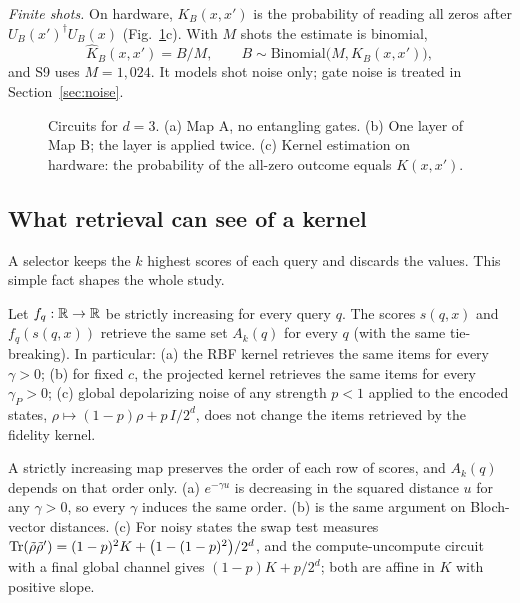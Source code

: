\emph{Finite shots.} On hardware, $K_B(x,x')$ is the probability of reading all zeros after
$U_B(x')^\dagger U_B(x)$ (Fig.~\ref{fig:circuits}c). With $M$ shots the estimate is binomial,
\begin{equation}
\hat K_B(x,x') = B/M,\qquad B\sim\mathrm{Binomial}\bigl(M,K_B(x,x')\bigr),
\label{eq:shots}
\end{equation}
and S9 uses $M=1{,}024$. It models shot noise only; gate noise is treated in Section~\ref{sec:noise}.

\begin{figure}[t]
\centering

\caption{Circuits for $d=3$. (a) Map A, no entangling gates. (b) One layer of Map B; the layer is
applied twice. (c) Kernel estimation on hardware: the probability of the all-zero outcome equals
$K(x,x')$.}
\label{fig:circuits}
\end{figure}

\subsection{What retrieval can see of a kernel}
\label{sec:rank}
A selector keeps the $k$ highest scores of each query and discards the values. This simple fact shapes
the whole study.

\begin{proposition}
\label{prop:rank}
Let $f_q:\mathbb{R}\to\mathbb{R}$ be strictly increasing for every query $q$. The scores $s(q,x)$ and $f_q(s(q,x))$
retrieve the same set $A_k(q)$ for every $q$ (with the same tie-breaking). In particular: (a) the RBF
kernel retrieves the same items for every $\gamma>0$; (b) for fixed $c$, the projected kernel retrieves
the same items for every $\gamma_P>0$; (c) global depolarizing noise of any strength $p<1$ applied to the
encoded states, $\rho\mapsto(1-p)\rho+p\,I/2^d$, does not change the items retrieved by the fidelity
kernel.
\end{proposition}
\begin{paperproof}
A strictly increasing map preserves the order of each row of scores, and $A_k(q)$ depends on that order
only. (a) $e^{-\gamma u}$ is decreasing in the squared distance $u$ for any $\gamma>0$, so every $\gamma$
induces the same order. (b) is the same argument on Bloch-vector distances. (c) For noisy states the
swap test measures $\operatorname{Tr}(\tilde\rho\tilde\rho')=(1-p)^2K+\bigl(1-(1-p)^2\bigr)/2^d$, and the
compute-uncompute circuit with a final global channel gives $(1-p)K+p/2^d$; both are affine in $K$
with positive slope.
\end{paperproof}

